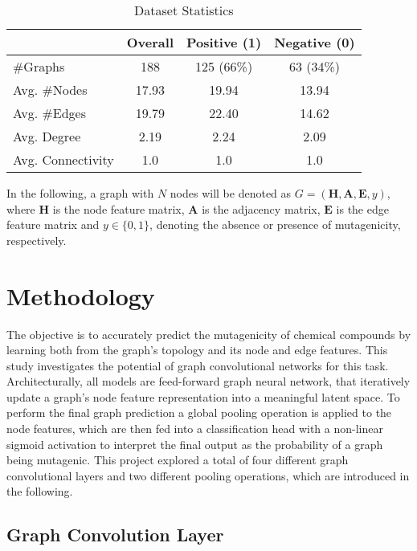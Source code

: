 \documentclass[10pt,conference,compsocconf]{IEEEtran}
\begin{document}
\begin{table}[ht]
  \centering
  \begin{tabular}{lccc}
    \toprule
    & \textbf{Overall} & \textbf{Positive} (1)& \textbf{Negative} (0) \\
    \midrule
    \#Graphs & 188 & 125 (66\%) & 63 (34\%) \\
    Avg. \#Nodes & 17.93 & 19.94 & 13.94 \\
    Avg. \#Edges & 19.79 & 22.40 & 14.62 \\
    Avg. Degree & 2.19 & 2.24 & 2.09 \\
    Avg. Connectivity & 1.0 & 1.0 & 1.0 \\
    \bottomrule
  \end{tabular}
  \caption{Dataset Statistics}
  \label{tab:dataset}
\end{table}

In the following, a graph with $N$ nodes will be denoted as $G = (\mathbf{H},
\mathbf{A}, \mathbf{E}, y)$, where $\mathbf{H}$ is the node feature matrix,
$\mathbf{A}$ is the adjacency matrix, $\mathbf{E}$ is the edge feature matrix
and $y \in \{0, 1\}$, denoting the absence or presence of mutagenicity,
respectively.

\section{Methodology}

The objective is to accurately predict the mutagenicity of chemical compounds by
learning both from the graph's topology and its node and edge features. This
study investigates the potential of graph convolutional networks for this task.
Architecturally, all models are feed-forward graph neural network, that
iteratively update a graph's node feature representation into a meaningful
latent space. To perform the final graph prediction a global pooling operation
is applied to the node features, which are then fed into a classification head
with a non-linear sigmoid activation to interpret the final output as the
probability of a graph being mutagenic. This project explored a total of four
different graph convolutional layers and two different pooling operations, which
are introduced in the following.


\subsection{Graph Convolution Layer}
\end{document}
